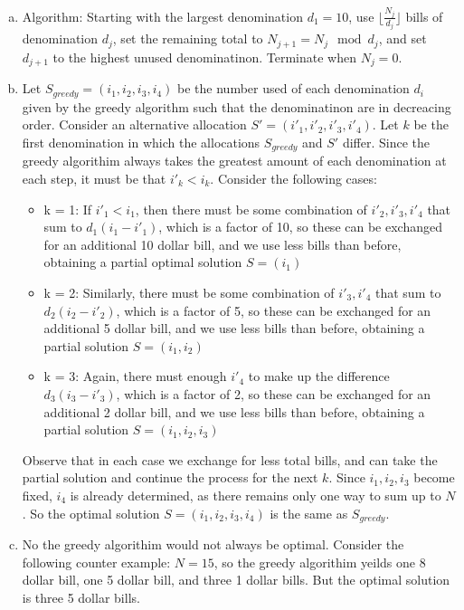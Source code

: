 \documentclass{article}
\begin{document}
\begin{enumerate}[a)]
    \item Algorithm: Starting with the largest denomination $d_1 = 10$, use $\lfloor \frac{N_j}{d_j} \rfloor$ bills of denomination $d_j$, set the remaining total to $N_{j + 1} = N_{j}\mod d_{j}$, and set $d_{j + 1}$ to the highest unused denominatinon. Terminate when $N_{j} = 0$.
    \item Let $S_{greedy} = (i_1, i_2, i_3, i_4)$ be the number used of each denomination $d_i$ given by the greedy algorithm such that the denominatinon are in decreacing order. Consider an alternative allocation $S' =  (i'_1, i'_2, i'_3, i'_4)$. Let $k$ be the first denomination in which the allocations $S_{greedy}$ and $S'$ differ. Since the greedy algorithim always takes the greatest amount of each denomination at each step, it must be that $i'_k < i_k$. Consider the following cases: 
    \begin{itemize}
        \item k = 1: If $i'_1 < i_1$, then there must be some combination of $i'_2, i'_3, i'_4$ that sum to $d_1(i_1 - i'_1)$, which is a factor of 10, so these can be exchanged for an additional 10 dollar bill, and we use less bills than before, obtaining a partial optimal solution $S = (i_1)$
        \item k = 2: Similarly, there must be some combination of $i'_3, i'_4$ that sum to $d_2(i_2 - i'_2)$, which is a factor of 5, so these can be exchanged for an additional 5 dollar bill, and we use less bills than before, obtaining a partial solution $S = (i_1, i_2)$
        \item k = 3: Again, there must enough $i'_4$ to make up the difference $d_3(i_3 - i'_3)$, which is a factor of 2, so these can be exchanged for an additional 2 dollar bill, and we use less bills than before, obtaining a partial solution $S = (i_1, i_2, i_3)$
    \end{itemize}
    Observe that in each case we exchange for less total bills, and can take the partial solution and continue the process for the next $k$. Since $i_1, i_2, i_3$ become fixed, $i_4$ is already determined, as there remains only one way to sum up to $N$. So the optimal solution $S = (i_1, i_2, i_3, i_4)$ is the same as $S_{greedy}$.

    \item No the greedy algorithim would not always be optimal. Consider the following counter example: $N = 15$, so the greedy algorithim yeilds one 8 dollar bill, one 5 dollar bill, and three 1 dollar bills. But the optimal solution is three 5 dollar bills.
\end{enumerate}
\end{document}
